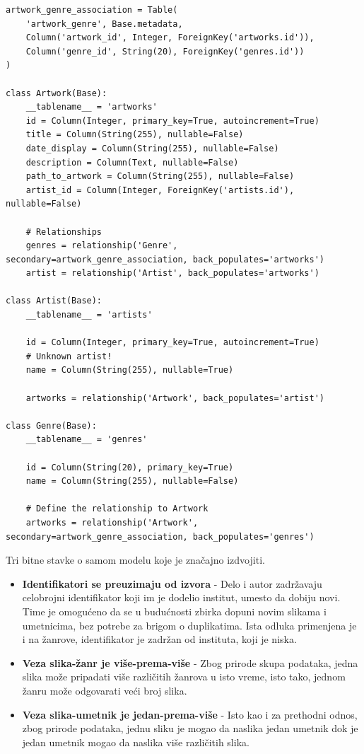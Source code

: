 \documentclass[12pt,oneside]{memoir}
\begin{document}
\begin{lstlisting}
artwork_genre_association = Table(
    'artwork_genre', Base.metadata,
    Column('artwork_id', Integer, ForeignKey('artworks.id')),
    Column('genre_id', String(20), ForeignKey('genres.id'))
)

class Artwork(Base):
    __tablename__ = 'artworks'
    id = Column(Integer, primary_key=True, autoincrement=True)
    title = Column(String(255), nullable=False)
    date_display = Column(String(255), nullable=False)
    description = Column(Text, nullable=False)
    path_to_artwork = Column(String(255), nullable=False)
    artist_id = Column(Integer, ForeignKey('artists.id'), nullable=False)

    # Relationships
    genres = relationship('Genre', secondary=artwork_genre_association, back_populates='artworks')
    artist = relationship('Artist', back_populates='artworks')

class Artist(Base):
    __tablename__ = 'artists'

    id = Column(Integer, primary_key=True, autoincrement=True)
    # Unknown artist!
    name = Column(String(255), nullable=True)

    artworks = relationship('Artwork', back_populates='artist')

class Genre(Base):
    __tablename__ = 'genres'

    id = Column(String(20), primary_key=True)
    name = Column(String(255), nullable=False)

    # Define the relationship to Artwork
    artworks = relationship('Artwork', secondary=artwork_genre_association, back_populates='genres')
\end{lstlisting}

Tri bitne stavke o samom modelu koje je značajno izdvojiti.
\begin{itemize}
\item \textbf{Identifikatori se preuzimaju od izvora} - Delo i autor zadržavaju celobrojni identifikator koji im je dodelio institut, umesto da dobiju novi. Time je omogućeno da se u budućnosti zbirka dopuni novim slikama i umetnicima, bez potrebe za brigom o duplikatima. Ista odluka primenjena je i na žanrove, identifikator je zadržan od instituta, koji je niska.
\item \textbf{Veza slika-žanr je više-prema-više} - Zbog prirode skupa podataka, jedna slika može pripadati više različitih žanrova u isto vreme, isto tako, jednom žanru može odgovarati veći broj slika.
\item \textbf{Veza slika-umetnik je jedan-prema-više} - Isto kao i za prethodni odnos, zbog prirode podataka, jednu sliku je mogao da naslika jedan umetnik dok je jedan umetnik mogao da naslika više različitih slika.
\end{itemize}
\end{document}
